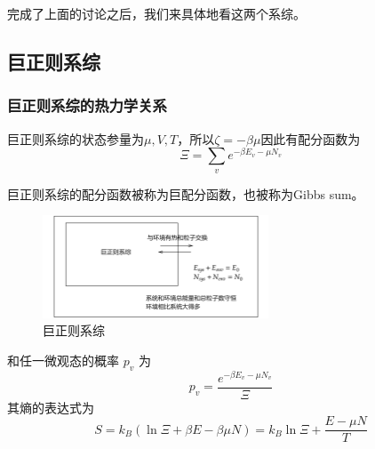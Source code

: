 完成了上面的讨论之后，我们来具体地看这两个系综。
\subsection{巨正则系综} %
\label{sub:巨正则系综}
\subsubsection{巨正则系综的热力学关系} %
\label{ssub:巨正则系综的热力学关系}
巨正则系综的状态参量为$\mu,V,T$，所以$\zeta =-\beta \mu $因此有配分函数为\begin{equation}
       \Xi=\sum_v e^{-\beta E_v-\mu N_v}
\end{equation}

\begin{remark}
       巨正则系综的配分函数被称为巨配分函数，也被称为Gibbs sum。
\end{remark}

\begin{figure}[h]
      \centering
      \includegraphics[width=0.6\textwidth]{fig/巨正则系综.png} 
      \caption{巨正则系综}
\end{figure}


和任一微观态的概率 $p_v$ 为\begin{equation}
       p_v=\frac{e^{-\beta E_v-\mu N_v}}{\Xi}
\end{equation}
其熵的表达式为\begin{equation}
       S=k_B (\ln \Xi+\beta E-\beta\mu N)=k_B \ln \Xi +\frac{E-\mu N}{T}
\end{equation}

